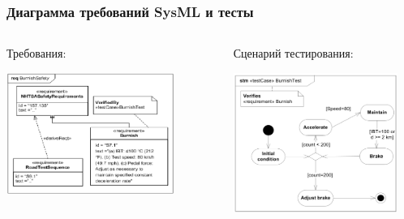 \documentclass{../cscslides}
\begin{document}
    \begin{frame}
        \frametitle{Диаграмма требований SysML и тесты}
        \begin{columns}
            \begin{column}{0.5\textwidth}
                Требования:
                \begin{center}
                    \includegraphics[width=0.8\textwidth]{sysMlRequirementsTest.png}
                \end{center}
            \end{column}
            \begin{column}{0.5\textwidth}
                Сценарий тестирования:
                \begin{center}
                    \includegraphics[width=0.9\textwidth]{sysMlRequirementsTestActivity.png}
                \end{center}
            \end{column}
        \end{columns}
    \end{frame}
\end{document}
